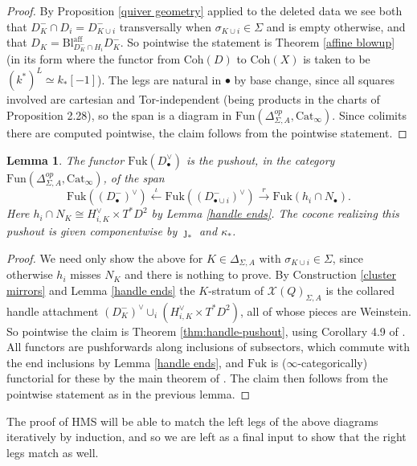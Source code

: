 \documentclass[11pt]{amsart}
\newtheorem{lem}[thm]{Lemma}
\theoremstyle{definition}
\theoremstyle{remark}
\newcommand{\Coh}{\mathrm{Coh}}
\newcommand{\Fuk}{\mathrm{Fuk}}
\numberwithin{equation}{section}
\begin{document}
\begin{proof}
By Proposition \ref{quiver geometry} applied to the deleted data we see both that $D^-_K\cap D_i=D^-_{K\cup i}$ transversally when $\sigma_{K\cup i}\in\Sigma$ and is empty otherwise, and that $D_K=\mathrm{Bl}^{\mathrm{aff}}_{D^-_K\cap H_i}D^-_K$. So pointwise the statement is Theorem \ref{affine blowup} (in its form where the functor from $\Coh(D)$ to $\Coh(X)$ is taken to be $(k^*)^L\simeq k_*[-1]$). The legs are natural in $\bullet$ by base change, since all squares involved are cartesian and Tor-independent (being products in the charts of Proposition 2.28), so the span is a diagram in $\mathrm{Fun}(\Delta^{op}_{\Sigma,A}, \mathrm{Cat}_\infty)$. Since colimits there are computed pointwise, the claim follows from the pointwise statement.
\end{proof}
 
\begin{lem}\label{lem:Aglue}The functor 
$\Fuk(D^\vee_\bullet)$ is the pushout, in the category $\mathrm{Fun}(\Delta^{op}_{\Sigma,A},\mathrm{Cat}_\infty)$, of the span
$$
\Fuk((D^-_\bullet)^\vee)\xleftarrow{\ \iota\ }\Fuk((D^-_{\bullet\cup i})^\vee)\xrightarrow{\ r\ }\Fuk(h_i\cap  N_\bullet).
$$
Here $h_i\cap  N_K\cong H^\vee_{i,K}\times T^*D^2$ by Lemma \ref{handle ends}. The cocone realizing this pushout is given componentwise by $\jmath_*$ and $\kappa_*$.
\end{lem}
 
\begin{proof}
We need only show the above for $K\in\Delta_{\Sigma,A}$ with $\sigma_{K\cup i}\in\Sigma$, since otherwise $h_i$ misses $ N_K$ and there is nothing to prove. By Construction \ref{cluster mirrors} and Lemma \ref{handle ends} the $K$-stratum of $\mathcal{X}(Q)_{\Sigma,A}$ is the collared handle attachment $(D^-_K)^\vee\cup_i(H^\vee_{i,K}\times T^*D^2)$, all of whose pieces are Weinstein. So pointwise the claim is Theorem \ref{thm:handle-pushout}, using Corollary 4.9 of \cite{GL}. All functors are pushforwards along inclusions of subsectors, which commute with the end inclusions by Lemma \ref{handle ends}, and $\Fuk$ is ($\infty$-categorically) functorial for these by the main theorem of \cite{GPSI}. The claim then follows from the pointwise statement as in the previous lemma.
\end{proof}

The proof of HMS will be able to match the left legs of the above diagrams iteratively by induction, and so we are left as a final input to show that the right legs match as well.
\end{document}
